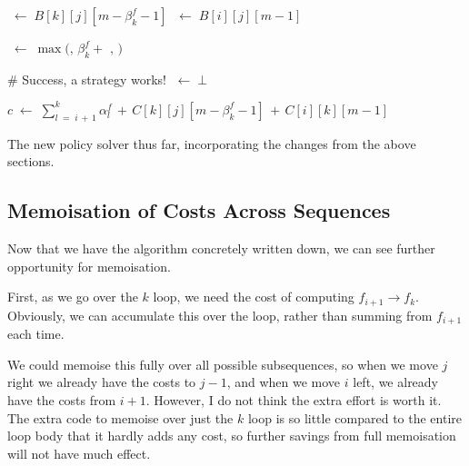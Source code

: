 \begin{algorithm}[htbp]
{{{{                    \PeakR \(\;\leftarrow\; B[k][j][m-\beta^f_k-1]\)\;
                    \PeakL \(\;\leftarrow\; B[i][j][m-1]\)\;
                    \BlankLine

                    \BlankLine

                    \Peak \(\;\leftarrow\; \max( \)\PeakFs\(,\, \beta^f_k + \) \PeakR\(,\,\)\PeakL\( ) \)\;
                    \BlankLine

                    \BlankLine

                    \# Success, a strategy works!\;
                    \Failed\(\;\leftarrow\; \bot\)\;
                    \BlankLine

                    \(c \;\leftarrow\; \sum_{l\;=\;i\,+\,1}^k \alpha^f_l \,+\, C[k][j][m-\beta^f_k-1] \,+\, C[i][k][m-1]\)\;
                    \BlankLine

                }
            }
        }
    }
    
    \caption{The new policy solver thus far, incorporating the changes from the above sections.}
    \label{alg:3-policy-solver-intermediate}
\end{algorithm}

\subsection{Memoisation of Costs Across Sequences}
Now that we have the algorithm concretely written down, we can see further opportunity for memoisation.

First, as we go over the \(k\) loop, we need the cost of computing \(f_{i+1}\rightarrow f_k\).
Obviously, we can accumulate this over the loop, rather than summing from \(f_{i+1}\) each time.

We could memoise this fully over all possible subsequences, so when we move \(j\) right we already have the costs to \(j-1\), and when we move \(i\) left, we already have the costs from \(i+1\).
However, I do not think the extra effort is worth it.
The extra code to memoise over just the \(k\) loop is so little compared to the entire loop body that it hardly adds any cost, so further savings from full memoisation will not have much effect.

